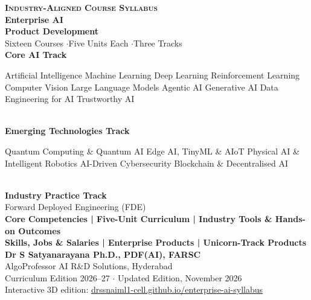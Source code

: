 \documentclass[10pt,a4paper]{article}
\begin{document}
\begin{center}
{\small\bfseries\color{gold}\textsc{Industry-Aligned Course Syllabus}}\\[10pt]
{\fontsize{34}{40}\selectfont\bfseries\color{navy}Enterprise AI\\Product Development}\\[12pt]
{\large\color{navy2}Sixteen Courses \quad$\cdot$\quad Five Units Each \quad$\cdot$\quad Three Tracks}\\[14pt]
{\bfseries\color{gold}Core AI Track}\\[2pt]
\begin{minipage}{0.86\textwidth}\centering\small Artificial Intelligence \textbullet{} Machine Learning \textbullet{} Deep Learning \textbullet{} Reinforcement Learning \textbullet{} Computer Vision \textbullet{} Large Language Models \textbullet{} Agentic AI \textbullet{} Generative AI \textbullet{} Data Engineering for AI \textbullet{} Trustworthy AI\end{minipage}\\[8pt]
{\bfseries\color{igreen}Emerging Technologies Track}\\[2pt]
\begin{minipage}{0.86\textwidth}\centering\small Quantum Computing \& Quantum AI \textbullet{} Edge AI, TinyML \& AIoT \textbullet{} Physical AI \& Intelligent Robotics \textbullet{} AI-Driven Cybersecurity \textbullet{} Blockchain \& Decentralised AI\end{minipage}\\[8pt]
{\bfseries\color{gold}Industry Practice Track}\\[2pt]
{\small Forward Deployed Engineering (FDE)}\\[12pt]
{\small\bfseries\color{navy2}Core Competencies \;|\; Five-Unit Curriculum \;|\; Industry Tools \& Hands-on Outcomes\\[2pt]
\color{gold}Skills, Jobs \& Salaries \;| Enterprise Products \;| Unicorn-Track Products}\\[18pt]
{\large\bfseries\color{navy}Dr S Satyanarayana Ph.D., PDF(AI), FARSC}\\[2pt]
{\small\color{navy2}AlgoProfessor AI R\&D Solutions, Hyderabad}\\[6pt]
{\footnotesize\color{gold}Curriculum Edition 2026--27 \;$\cdot$\; Updated Edition, November 2026}\\[4pt]
{\footnotesize\color{muted}Interactive 3D edition: \href{https://drssnaiml1-cell.github.io/enterprise-ai-syllabus/}{drssnaiml1-cell.github.io/enterprise-ai-syllabus}}
\end{center}
\newpage
\end{document}
